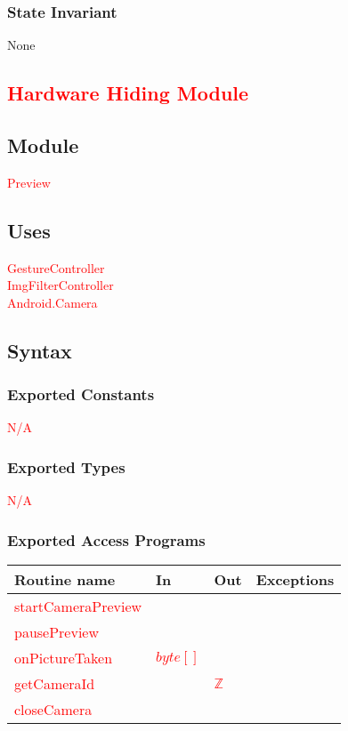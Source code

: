 \documentclass[12pt, titlepage]{article}
\begin{document}
\subsubsection* {State Invariant}

None

\newpage

\textcolor{red}{\section* {Hardware Hiding Module}}

\subsection*{Module}

\textcolor{red}{Preview}

\subsection* {Uses}

\textcolor{red}{
GestureController\\
ImgFilterController\\
Android.Camera
}

\subsection* {Syntax}

\subsubsection* {Exported Constants}

\textcolor{red}{N/A}


\subsubsection* {Exported Types}

\textcolor{red}{N/A}

\subsubsection* {Exported Access Programs}

\begin{tabular}{| l | l | l | l |}
\hline
\textbf{Routine name} & \textbf{In} & \textbf{Out} & \textbf{Exceptions}\\
\hline
\textcolor{red}{startCameraPreview} & &  & \\
\hline
\textcolor{red}{pausePreview} & & & \\
\hline
\textcolor{red}{onPictureTaken} & \textcolor{red}{$byte[]$} & & \\
\hline
\textcolor{red}{getCameraId} & & \textcolor{red}{$\mathbb{Z}$} & \\
\hline
\textcolor{red}{closeCamera} & & & \\
\hline

\end{tabular}
\end{document}
